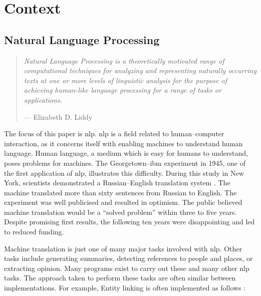 \chapter{Context}\label{context}

\section{Natural Language Processing}\label{natural-language-processing}

\begin{quote}
  \textit{Natural Language Processing is a theoretically motivated range
    of computational techniques for analyzing and representing
    naturally occurring texts at one or more levels of linguistic
    analysis for the purpose of achieving human-like language processing
    for a range of tasks or applications.
  }

  \medskip
  --- Elizabeth D. Liddy \autocite*{natural-language-processing-liddy-2001}
\end{quote}

\noindent The focus of this paper is \gls{nlp}.
\gls{nlp} is a field related to human--computer interaction, as it
  concerns itself with enabling machines to understand human language.
Human language, a medium which is easy for humans to understand, poses
  problems for machines.
The Georgetown--\gls{ibm} experiment in 1945, one of the first application
  of \gls{nlp}, illustrates this difficulty.
During this study in New York, scientists demonstrated a
  Russian--English translation system
  \autocite{hutchins-john-georgetown-ibm-system}.
The machine translated more than sixty sentences from Russian to English.
The experiment was well publicised and resulted in optimism.
The public believed machine translation would be a ``solved problem'' within
  three to five years.
Despite promising first results, the following ten years were disappointing
  and led to reduced funding.

Machine translation is just one of many major tasks involved with \gls{nlp}.
Other tasks include generating summaries, detecting references to people
  and places, or extracting opinion.
Many programs exist to carry out these and many other \gls{nlp} tasks.
The approach taken to perform these tasks are often similar between
  implementations.
For example, Entity linking is often implemented as follows
  \autocite[according to][]{stanbol-enhancer-nlp}:

